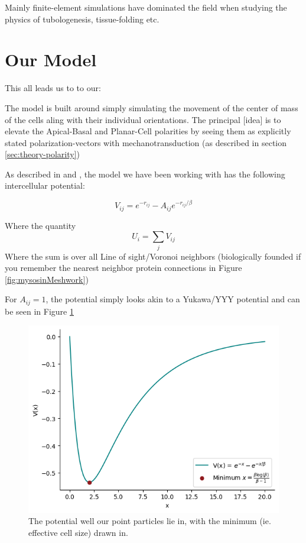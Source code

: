 Mainly finite-element simulations have dominated the field when studying the physics of tubologenesis, tissue-folding etc.  


\section{Our Model}
This all leads us to to our:


The model is built around simply simulating the movement of the center of mass of the cells aling with their individual orientations. The principal [idea] is to elevate the Apical-Basal and Planar-Cell polarities by seeing them as explicitly stated polarization-vectors with mechanotransduction (as described in section \ref{sec:theory-polarity})

As described in \cite{} and \cite{}, the model we have been working with has the following intercellular potential:

\begin{equation}
    V_{ij}=e^{-r_{ij}}-A_{ij}e^{-r_{ij}/\beta}
\end{equation}

Where the quantity 
\begin{equation}
    U_i = \sum_j V_{ij}
\end{equation}
Where the sum is over all Line of sight/Voronoi neighbors (biologically founded if you remember the nearest neighbor protein connections in Figure \ref{fig:mysosinMeshwork})

For $A_{ij}=1$, the potential simply looks akin to a Yukawa/YYY potential and can be seen in Figure \ref{fig:potential} 
\begin{figure}[H]
    \centering
    \includegraphics[width=0.7\linewidth]{chapters/Theory/figures/potential.png}
    \caption{The potential well our point particles lie in, with the minimum (ie. effective cell size) drawn in.}
    \label{fig:potential}
\end{figure}

